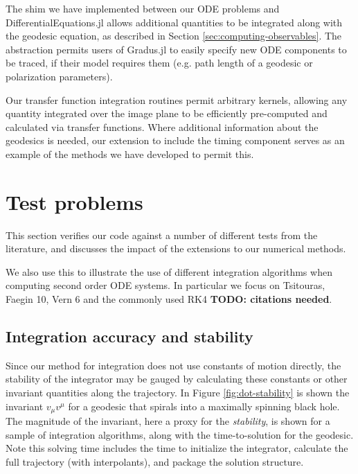 \documentclass[fleqn,usenatbib]{mnras}
\newcommand{\todo}[1]{{\noindent \bf \color{red} TODO: #1}}
\newcommand{\Gradus}{Gradus.jl }
\begin{document}
The shim we have implemented between our ODE problems and
DifferentialEquations.jl allows additional quantities to be integrated along
with the geodesic equation, as described in Section
\ref{sec:computing-observables}. The abstraction permits users of \Gradus to
easily specify new ODE components to be traced, if their model requires them
(e.g. path length of a geodesic or polarization parameters).

Our transfer function integration routines permit arbitrary kernels, allowing
any quantity integrated over the image plane to be efficiently pre-computed and
calculated via transfer functions. Where additional information about the
geodesics is needed, our extension to include the timing component serves as an
example of the methods we have developed to permit this.

\section{Test problems}
\label{sec:test-problems}

This section verifies our code against a number of different tests from the
literature, and discusses the impact of the extensions to our numerical methods.

We also use this to illustrate the use of different integration algorithms when
computing second order ODE systems. In particular we focus on Tsitouras, Faegin
10, Vern 6 and the commonly used RK4 \todo{citations needed}.

\subsection{Integration accuracy and stability}

Since our method for integration does not use constants of motion directly, the
stability of the integrator may be gauged by calculating these constants or
other invariant quantities along the trajectory. In Figure
\ref{fig:dot-stability} is shown the invariant $v_\mu v^\mu$ for a geodesic that
spirals into a maximally spinning black hole. The magnitude of the invariant,
here a proxy for the \emph{stability}, is shown for a sample of integration algorithms,
along with the time-to-solution for the geodesic. Note this solving time
includes the time to initialize the integrator, calculate the full trajectory
(with interpolants), and package the solution structure.
\end{document}
